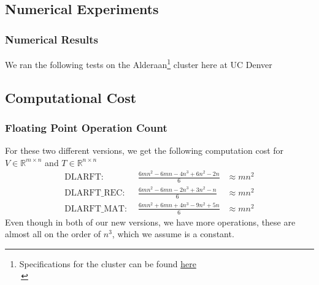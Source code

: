 \documentclass[12pt]{beamer}
\newcommand{\R}{\mathbb{R}}
\begin{document}
    \subsection{Numerical Experiments}
    \begin{frame}
        \frametitle{Numerical Results}
        We ran the following tests on the Alderaan\footnote{Specifications for the cluster can be found 
        \textcolor{blue}{\href{https://ccm-docs.readthedocs.io/en/latest/alderaan\#hardware}{here}}\\\,} 
        cluster here at UC Denver\\
        \begin{center}
        \end{center}
    \end{frame}
    \subsection{Computational Cost}
    \begin{frame}
        \frametitle{Floating Point Operation Count}
        For these two different versions, we get the following computation cost for $V\in\R^{m\times n}$ and  $T\in\R^{n\times n}$
        $$
        \begin{aligned}
            \text{DLARFT: }&\,      \frac{6mn^2 - 6mn -4n^3 +6n^2 - 2n}{6}&\approx mn^2\\
            \text{DLARFT\_REC: }&\, \frac{6mn^2 - 6mn -2n^3 +3n^2 -  n}{6}&\approx mn^2\\
            \text{DLARFT\_MAT: }&\, \frac{6mn^2 + 6mn +4n^3 -9n^2 + 5n}{6}&\approx mn^2 
        \end{aligned}
        $$
        Even though in both of our new versions, we have more operations, these are almost all on the order of $n^3$, 
        which we assume is a constant.
    \end{frame}
\end{document}
